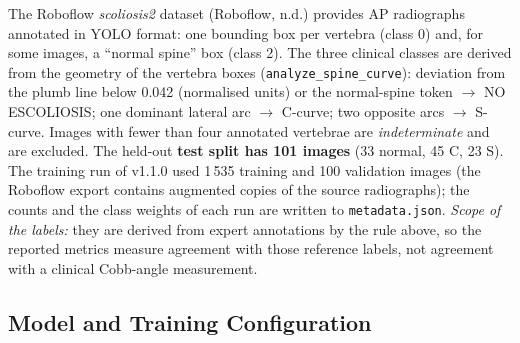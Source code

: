 \documentclass[12pt,a4paper]{article}
\newcommand{\fp}[1]{\nolinkurl{#1}}
\begin{document}
The Roboflow \emph{scoliosis2} dataset (Roboflow, n.d.) provides AP radiographs annotated in YOLO
format: one bounding box per vertebra (class 0) and, for some images, a ``normal spine'' box (class 2).
The three clinical classes are derived from the geometry of the vertebra boxes
(\fp{analyze_spine_curve}): deviation from the plumb line below 0.042 (normalised units) or the
normal-spine token $\to$ NO ESCOLIOSIS; one dominant lateral arc $\to$ C-curve; two opposite arcs $\to$
S-curve. Images with fewer than four annotated vertebrae are \emph{indeterminate} and are excluded. The
held-out \textbf{test split has 101 images} (33 normal, 45 C, 23 S). The training run of v1.1.0 used 1\,535 training and 100 validation images
(the Roboflow export contains augmented copies of the source radiographs); the counts and the class weights
of each run are written to \texttt{metadata.json}. \emph{Scope of the labels:} they are derived from expert annotations by the rule above, so the reported
metrics measure agreement with those reference labels, not agreement with a clinical Cobb-angle measurement.

\subsection{Model and Training Configuration}
\end{document}
